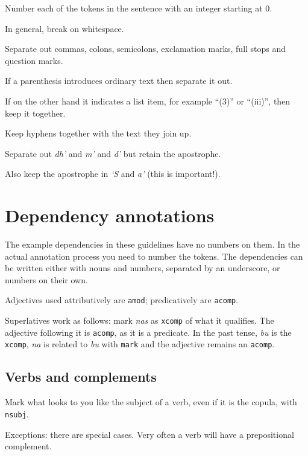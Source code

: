 \documentclass[a4paper]{article}
\begin{document}
 Number each of the tokens in the sentence with an integer starting at 0.

 In general, break on whitespace.

 Separate out commas, colons, semicolons, exclamation marks, full stops and question marks.

 If a parenthesis introduces ordinary text then separate it out.

 If on the other hand it indicates a list item, for example ``(3)'' or ``(iii)'', then keep it together.

 Keep hyphens together with the text they join up.

 Separate out \textit{dh'} and \textit{m'} and \textit{d'} but retain the apostrophe.

 Also keep the apostrophe in \textit{`S} and \textit{a'} (this is important!).

\section{Dependency annotations}

 The example dependencies in these guidelines have no numbers on them. In the actual annotation process you need to number the tokens. The dependencies can be written either with nouns and numbers, separated by an underscore, or numbers on their own.

 Adjectives used attributively are \texttt{amod}; predicatively are \texttt{acomp}.

 Superlatives work as follows: mark \textit{nas} as \texttt{xcomp} of what it qualifies. The adjective following it is \texttt{acomp}, as it is a predicate. In the past tense, \textit{bu} is the \texttt{xcomp}, \textit{na} is related to \textit{bu} with \texttt{mark} and the adjective remains an \texttt{acomp}.

\subsection{Verbs and complements}

 Mark what looks to you like the subject of a verb, even if it is the copula, with \texttt{nsubj}.

Exceptions: there are special cases.
Very often a verb will have a prepositional complement.
\end{document}
